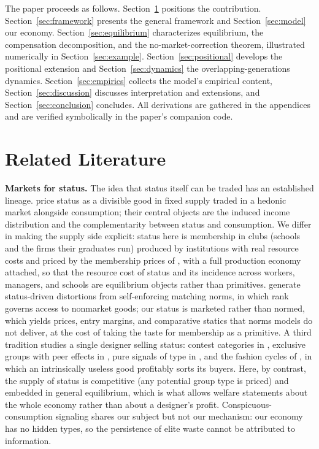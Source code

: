 \documentclass[12pt,letterpaper]{article}
\theoremstyle{definition}
\begin{document}
The paper proceeds as follows.
Section~\ref{sec:lit} positions the contribution.
Section~\ref{sec:framework} presents the general framework and Section~\ref{sec:model} our economy.
Section~\ref{sec:equilibrium} characterizes equilibrium, the compensation decomposition, and the no-market-correction theorem, illustrated numerically in Section~\ref{sec:example}.
Section~\ref{sec:positional} develops the positional extension and Section~\ref{sec:dynamics} the overlapping-generations dynamics.
Section~\ref{sec:empirics} collects the model's empirical content, Section~\ref{sec:discussion} discusses interpretation and extensions, and Section~\ref{sec:conclusion} concludes.
All derivations are gathered in the appendices and are verified symbolically in the paper's companion code.

\section{Related Literature}\label{sec:lit}

\textbf{Markets for status.}
The idea that status itself can be traded has an established lineage.
\citet{beckermurphywerning2005} price status as a divisible good in fixed supply traded in a hedonic market alongside consumption; their central objects are the induced income distribution and the complementarity between status and consumption.
We differ in making the supply side explicit: status here is membership in clubs (schools and the firms their graduates run) produced by institutions with real resource costs and priced by the membership prices of \citet{ellickson1999clubs}, with a full production economy attached, so that the resource cost of status and its incidence across workers, managers, and schools are equilibrium objects rather than primitives.
\citet{colemailathpostlewaite1992} generate status-driven distortions from self-enforcing matching norms, in which rank governs access to nonmarket goods; our status is marketed rather than normed, which yields prices, entry margins, and comparative statics that norms models do not deliver, at the cost of taking the taste for membership as a primitive.
A third tradition studies a single designer selling status: contest categories in \citet{moldovanuselashi2007}, exclusive groups with peer effects in \citet{board2009group}, pure signals of type in \citet{rayo2013signal}, and the fashion cycles of \citet{pesendorfer1995fashion}, in which an intrinsically useless good profitably sorts its buyers.
Here, by contrast, the supply of status is competitive (any potential group type is priced) and embedded in general equilibrium, which is what allows welfare statements about the whole economy rather than about a designer's profit.
Conspicuous-consumption signaling \citep{bagwellbernheim1996veblen} shares our subject but not our mechanism: our economy has no hidden types, so the persistence of elite waste cannot be attributed to information.
\end{document}
